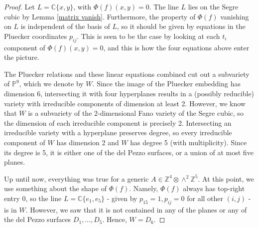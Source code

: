 \documentclass{report}
\begin{document}
\begin{proof}
Let $L = \mathbb{C}\{x,y\}$, with $\Phi(f)(x,y) = 0$.  The line $L$ lies on the Segre cubic by Lemma \ref{matrix vanish}.  Furthermore, the property of $\Phi(f)$ vanishing on $L$ is independent of the basis of $L$, so it should be given by equations in the Pluecker coordinates $p_{ij}$.  This is seen to be the case by looking at each $t_i$ component of $\Phi(f)(x,y) = 0$, and this is how the four equations above enter the picture.

The Pluecker relations and these linear equations combined cut out a subvariety of $\mathbb{P}^9$, which we denote by $W$.  Since the image of the Pluecker embedding has dimension 6, intersecting it with four hyperplanes results in a (possibly reducible) variety with irreducible components of dimension at least 2.  However, we know that $W$ is a subvariety of the 2-dimensional Fano variety of the Segre cubic, so the dimension of each irreducible component is precisely 2.  Intersecting an irreducible variety with a hyperplane preserves degree, so every irreducible component of $W$ has dimension 2 and $W$ has degree 5 (with multiplicity).  Since its degree is 5, it is either one of the del Pezzo surfaces, or a union of at most five planes.

Up until now, everything was true for a generic $A \in \mathbb{Z}^4 \otimes \wedge^2 \mathbb{Z}^5$.  At this point, we use something about the shape of $\Phi(f)$.  Namely, $\Phi(f)$ always has top-right entry 0, so the line $L = \mathbb{C} \{e_1, e_5 \}$ - given by $p_{15} = 1, p_{ij} = 0$ for all other $(i,j)$ - is in $W$.  However, we saw that it is not contained in any of the planes or any of the del Pezzo surfaces $D_1, \ldots, D_5$.  Hence, $W = D_6$.
\end{proof}
\end{document}
